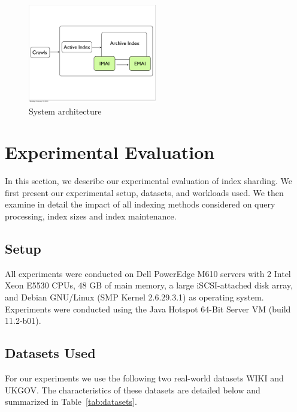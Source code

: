 \begin{figure}[tb]
  	\centering
	\includegraphics[width=0.5\textwidth]{resources/system_arch_incsh.pdf}
   	\caption{System architecture}
		  \label{fig:archive_indexing_system}	
\end{figure}


\section{Experimental Evaluation}
\label{chap:sharding:sec:eval}

In this section, we describe our experimental evaluation of index sharding. We first present our experimental setup, datasets, and workloads used. We then examine in detail the impact of all indexing methods considered on query processing, index sizes and index maintenance. 

\subsection {Setup}
 All experiments were conducted on Dell
PowerEdge M610 servers with 2 Intel Xeon E5530 CPUs, 48 GB of main
memory, a large iSCSI-attached disk array, and Debian GNU/Linux (SMP
Kernel 2.6.29.3.1) as operating system. Experiments were conducted
using the Java Hotspot 64-Bit Server VM (build 11.2-b01). 

\subsection{Datasets Used}
For our experiments we use the following two real-world datasets WIKI and UKGOV. The characteristics of these datasets are detailed below and summarized in Table~\ref{tab:datasets}.

